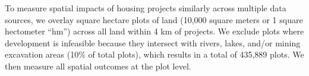 \documentclass[12pt]{article}
\begin{document}





To measure spatial impacts of housing projects similarly across multiple data sources, we overlay square hectare plots of land (10,000 square meters or 1 square hectometer ``hm'') across all land within 4 km of projects.  We exclude plots where development is infeasible because they intersect with rivers, lakes, and/or mining excavation areas (10\% of total plots), which results in a total of 435,889 plots.  We then measure all spatial outcomes at the plot level.
\end{document}
